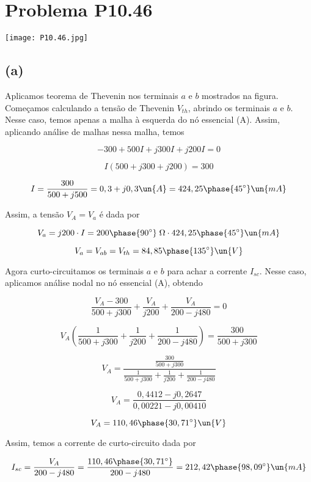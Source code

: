 
\section*{Problema P10.46}

\renewcommand*\thesection{10.46}

\begin{center}
    \texttt{[image: P10.46.jpg]}
\end{center}

\subsection*{(a)}

Aplicamos teorema de Thevenin nos terminais $a$ e $b$ mostrados na figura. \\
Começamos calculando a tensão de Thevenin $V_{th}$, abrindo os terminais $a$ e $b$. Nesse caso, temos apenas a malha à esquerda
do nó essencial (A). Assim, aplicando análise de malhas nessa malha, temos

\[ -300 + 500I + j300I + j200I = 0 \]

\[ I(500 + j300 + j200) = 300 \]

\[ I = \frac{300}{500 + j500} = 0,3 + j0,3 \un{A} = 424,25\phase{45^{\circ}} \un{mA}\]

Assim, a tensão $V_A = V_a$ é dada por   

\[ V_a = j200 \cdot I = 200\phase{90^{\circ}} \;\Omega \cdot 424,25\phase{45^{\circ}} \un{mA}\]

\[ V_a = V_{ab} = V_{th} = 84,85\phase{135^{\circ}} \un{V}\]

Agora curto-circuitamos os terminais $a$ e $b$ para achar a corrente $I_{sc}$. Nesse caso, aplicamos análise nodal no nó
essencial (A), obtendo

\[ \frac{V_A - 300}{500 + j300} + \frac{V_A}{j200} + \frac{V_A}{200 - j480} = 0 \]

\[ V_A\left(\frac{1}{500 + j300} + \frac{1}{j200} + \frac{1}{200 - j480}\right) = \frac{300}{500 + j300} \]

\[ V_A = \frac{\frac{300}{500 + j300}}{\frac{1}{500 + j300} + \frac{1}{j200} + \frac{1}{200 - j480}} \]

\[ V_A = \frac{0,4412 - j0,2647}{0,00221 - j0,00410} \]

\[ V_A = 110,46\phase{30,71^{\circ}} \un{V} \]

Assim, temos a corrente de curto-circuito dada por

\[ I_{sc} = \frac{V_A}{200 - j480} = \frac{110,46\phase{30,71^{\circ}}}{200 - j480} = 212,42\phase{98,09^{\circ}}\un{mA} \]

